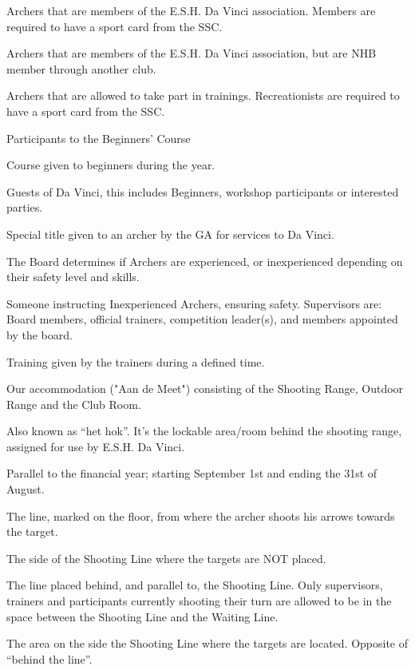 \documentclass[a4paper]{article}
\begin{document}
\begin{description}[font=\sffamily\bfseries, leftmargin=1cm, style=nextline]
\item[Member]
Archers that are members of the E.S.H. Da Vinci association. Members are required to have a sport card from the SSC.
\item[External Member]
Archers that are members of the E.S.H. Da Vinci association, but are NHB member through another club.
\item[Recreationist]
Archers that are allowed to take part in trainings. Recreationists are required to have a sport card from the SSC.
\item[Beginner]
Participants to the Beginners' Course
\item[Beginners' Course] Course given to beginners during the year.
\item[Guest] Guests of Da Vinci, this includes Beginners, workshop participants or interested parties.
\item[Honorary Member] Special title given to an archer by the GA for services to Da Vinci.
\item[Experienced - Inexperienced] The Board determines if Archers are experienced, or inexperienced depending on their safety level and skills.
\item[Supervisor] Someone instructing Inexperienced Archers, ensuring safety. Supervisors are: Board members, official trainers, competition leader(s), and members appointed by the board.
\item[General Training] Training given by the trainers during a defined time.

\item[Accommodation] Our accommodation ("Aan de Meet") consisting of the Shooting Range, Outdoor Range and the Club Room.
\item[Club Room] Also known as “het hok”. It’s the lockable area/room behind the shooting range, assigned for use by E.S.H. Da Vinci.
    \item[Association Year]
    Parallel to the financial year; starting September 1st and ending the 31st of August. 
    
    \item[Shooting Line]
    The line, marked on the floor, from where the archer shoots his arrows towards the target.
    \item[“Behind the line”]
    The side of the Shooting Line where the targets are NOT placed. 
    \item[Waiting Line]
The line placed behind, and parallel to, the Shooting Line. Only supervisors, trainers and participants currently shooting their turn are allowed to be in the space between the Shooting Line and the Waiting Line. 


\item[Downrange of the Line] The area on the side the Shooting Line where the targets are located. Opposite of ``behind the line''.

\end{description}
\end{document}
